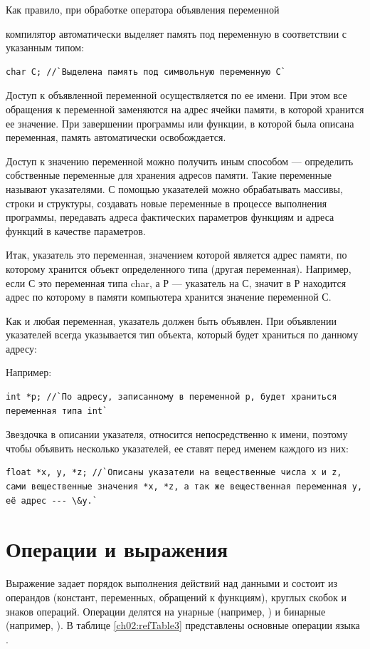 Как правило, при обработке оператора объявления переменной 


компилятор автоматически выделяет память под переменную
 в соответствии с указанным типом:
\begin{lstlisting}
char C; //`Выделена память под символьную переменную C`
\end{lstlisting}
Доступ к объявленной переменной осуществляется по ее имени. При
этом все обращения к переменной заменяются на адрес ячейки памяти, в которой хранится ее значение. При завершении
программы или функции, в которой была описана переменная, память автоматически освобождается.

Доступ к значению переменной можно получить иным способом --- определить собственные
переменные для хранения адресов памяти. Такие переменные называют
указателями. С помощью указателей можно обрабатывать массивы,
строки и структуры, создавать новые переменные в процессе выполнения программы, передавать адреса фактических
параметров функциям и адреса функций в качестве параметров.

Итак, указатель это переменная, значением которой является
адрес памяти, по которому хранится объект определенного типа (другая переменная). Например, если
С это переменная типа
char, а Р --- указатель на
С, значит в Р находится адрес по которому в
памяти компьютера хранится значение переменной С.

Как и любая переменная, указатель должен быть объявлен. При
объявлении указателей всегда указывается тип объекта, который будет храниться по данному адресу:


Например:
\begin{lstlisting}
int *p; //`По адресу, записанному в переменной p, будет храниться переменная типа int`
\end{lstlisting}
Звездочка в описании указателя, относится непосредственно к имени, поэтому чтобы объявить несколько
указателей, ее ставят перед именем каждого из них: 
\begin{lstlisting}
float *x, y, *z; //`Описаны указатели на вещественные числа x и z, сами вещественные значения *x, *z, а так же вещественная переменная y, её адрес --- \&y.`
\end{lstlisting}
\section[Операции и выражения]{Операции и выражения}\label{ch02:6}
Выражение задает порядок выполнения действий над данными и состоит из
операндов (констант, переменных, обращений к функциям), круглых скобок и знаков
операций. Операции делятся на унарные
(например, ) и бинарные
(например,  ). В таблице \ref{ch02:refTable3} представлены основные операции языка .


